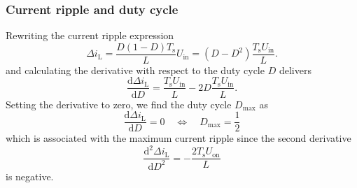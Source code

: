 \begin{frame}
    \frametitle{Current ripple and duty cycle}
    Rewriting the current ripple expression
    \begin{equation*}
            \Delta i_\mathrm{L} = \frac{D(1-D)T_\mathrm{s}}{L}U_\mathrm{in} = (D-D^2)\frac{T_\mathrm{s}U_\mathrm{in}}{L}.
    \end{equation*}
    and calculating the derivative with respect to the duty cycle $D$ delivers
    \begin{equation}
        \frac{\mathrm{d}\Delta i_\mathrm{L}}{\mathrm{d}D} = \frac{T_\mathrm{s}U_\mathrm{in}}{L} - 2D\frac{T_\mathrm{s}U_\mathrm{in}}{L}.
    \end{equation}
    Setting the derivative to zero, we find the duty cycle $D_\mathrm{max}$ as
    \begin{equation}
        \frac{\mathrm{d}\Delta i_\mathrm{L}}{\mathrm{d}D} = 0 \quad \Leftrightarrow \quad D_\mathrm{max} = \frac{1}{2}
        \label{eq:duty-cycle-max}
    \end{equation}
    which is associated with the maximum current ripple since the second derivative 
    \begin{equation}
        \frac{\mathrm{d}^2\Delta i_\mathrm{L}}{\mathrm{d}D^2} = -\frac{2T_\mathrm{s}U_\mathrm{on}}{L}
    \end{equation}
    is negative. 
\end{frame}

